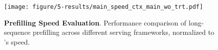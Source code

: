 \begin{figure}[t]
    \centering
    \texttt{[image: figure/5-results/main\_speed\_ctx\_main\_wo\_trt.pdf]}
    \caption{\textbf{Prefilling Speed Evaluation}. Performance comparison of long-sequence prefilling across different serving frameworks, normalized to \system's speed.
    }%
    \label{fig:evaluation:main_speed_prefill}
\end{figure}
